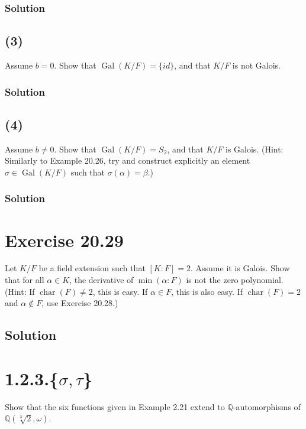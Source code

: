 \documentclass[fleqn]{article}
\DeclareMathOperator{\Gal}{Gal}
\DeclareMathOperator{\Char}{char}
\begin{document}
            \subsubsection{Solution}
            
        
        \subsection{(3)}
        Assume $b = 0$.  Show that $\Gal(K/F) = \{id\}$, and that $K/F$ is not Galois.
            
            \subsubsection{Solution}
            
        
        \subsection{(4)}
        Assume $b \neq 0$.  Show that $\Gal(K/F) = S_2$, and that $K/F$ is Galois.  (Hint: Similarly to Example 20.26, try and construct explicitly an element $\sigma \in \Gal(K/F)$ such that $\sigma(\alpha) = \beta$.)
        
            \subsubsection{Solution}
            
    
    \section{Exercise 20.29}
    Let $K/F$ be a field extension such that $[K : F] = 2$.  Assume it is Galois.  Show that for all $\alpha \in K$, the derivative of $\min(\alpha : F)$ is not the zero polynomial.  (Hint: If $\Char(F) \neq 2$, this is easy.  If $\alpha \in F$, this is also easy.  If $\Char(F) = 2$ and $\alpha \notin F$, use Exercise 20.28.)
        
        \subsection{Solution}
        
    
    \section{1.2.3.\{$\sigma, \tau$\}}
    Show that the six functions given in Example 2.21 extend to $\mathbb{Q}$-automorphisms of $\mathbb{Q}\left(\sqrt[3]{2}, \omega\right)$.
        
\end{document}
